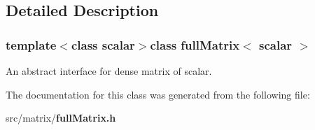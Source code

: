\subsection{Detailed Description}
\subsubsection*{template$<$class scalar$>$class full\-Matrix$<$ scalar $>$}

An abstract interface for dense matrix of scalar. 

The documentation for this class was generated from the following file\-:\begin{DoxyCompactItemize}
\item 
src/matrix/{\bf full\-Matrix.\-h}\end{DoxyCompactItemize}
